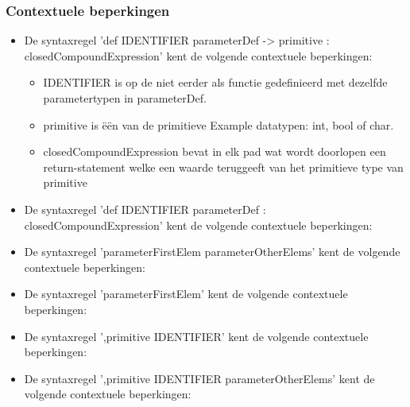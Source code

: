     \subsubsection{Contextuele beperkingen}
        \begin{itemize}
        \item De syntaxregel 'def IDENTIFIER parameterDef -> primitive $\colon$ closedCompoundExpression' kent de volgende contextuele beperkingen:
            \begin{itemize}
                \item IDENTIFIER is op de niet eerder als functie gedefinieerd met dezelfde parametertypen in parameterDef.
                \item primitive is \"{e}\"{e}n van de primitieve Example datatypen: int, bool of char.
                \item closedCompoundExpression bevat in elk pad wat wordt doorlopen een return-statement welke een waarde teruggeeft van het primitieve type van primitive
            \end{itemize}
        \item De syntaxregel 'def IDENTIFIER parameterDef $\colon$ closedCompoundExpression' kent de volgende contextuele beperkingen:
            \begin{itemize}
            \end{itemize}
        \item De syntaxregel 'parameterFirstElem parameterOtherElems' kent de volgende contextuele beperkingen:
            \begin{itemize}
            \end{itemize}        
        \item De syntaxregel 'parameterFirstElem' kent de volgende contextuele beperkingen:
            \begin{itemize}
            \end{itemize}        
        \item De syntaxregel ',primitive IDENTIFIER' kent de volgende contextuele beperkingen:
            \begin{itemize}
            \end{itemize}  
        \item De syntaxregel ',primitive IDENTIFIER parameterOtherElems' kent de volgende contextuele beperkingen:        
            \begin{itemize}
            \end{itemize}  
        \end{itemize}

